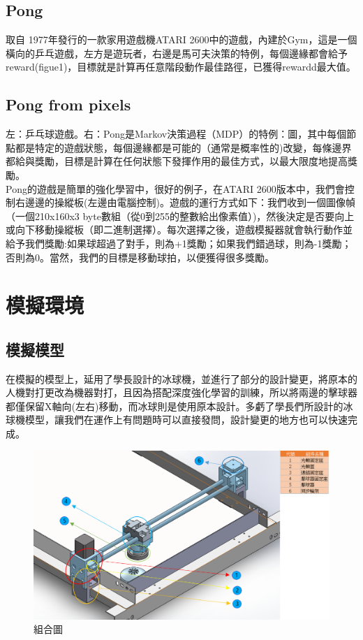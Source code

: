 \documentclass[14pt,a4paper]{report}  %
\begin{document}
\section{Pong}
 取自 1977年發行的一款家用遊戲機ATARI 2600中的遊戲，內建於Gym，這是一個橫向的乒乓遊戲，左方是遊玩者，右邊是馬可夫決策的特例，每個邊緣都會給予reward(figue1)，目標就是計算再任意階段動作最佳路徑，已獲得rewardd最大值。\\
\section{Pong from pixels}
 左：乒乓球遊戲。右：Pong是Markov決策過程（MDP）的特例：圖，其中每個節點都是特定的遊戲狀態，每個邊緣都是可能的（通常是概率性的)改變，每條邊界都給與獎勵，目標是計算在任何狀態下發揮作用的最佳方式，以最大限度地提高獎勵。\\ 
Pong的遊戲是簡單的強化學習中，很好的例子，在ATARI 2600版本中，我們會控制右邊邊的操縱板(左邊由電腦控制)。遊戲的運行方式如下：我們收到一個圖像幀（一個210x160x3 byte數組（從0到255的整數給出像素值）)，然後決定是否要向上或向下移動操縱板（即二進制選擇）。每次選擇之後，遊戲模擬器就會執行動作並給予我們獎勵:如果球超過了對手，則為+1獎勵；如果我們錯過球，則為-1獎勵；否則為0。當然，我們的目標是移動球拍，以便獲得很多獎勵。\\

\newpage
\chapter{模擬環境}
\section{模擬模型}
 在模擬的模型上，延用了學長設計的冰球機，並進行了部分的設計變更，將原本的人機對打更改為機器對打，且因為搭配深度強化學習的訓練，所以將兩邊的擊球器都僅保留X軸向(左右)移動，而冰球則是使用原本設計。多虧了學長們所設計的冰球機模型，讓我們在運作上有問題時可以直接發問，設計變更的地方也可以快速完成。\\
\begin{figure}[hbt!]
\center
\includegraphics[width=13cm]{model}
\caption{\Large 組合圖}
\label{model}
\end{figure}
\end{document}
